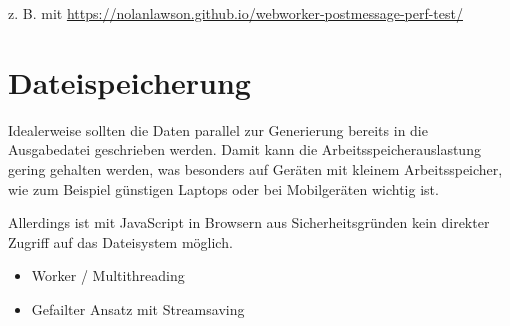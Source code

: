 z. B. mit \url{https://nolanlawson.github.io/webworker-postmessage-perf-test/}


\section{Dateispeicherung}

Idealerweise sollten die Daten parallel zur Generierung bereits in die Ausgabedatei geschrieben werden. Damit kann die Arbeitsspeicherauslastung gering gehalten werden, was besonders auf Geräten mit kleinem Arbeitsspeicher, wie zum Beispiel günstigen Laptops oder bei Mobilgeräten wichtig ist.

Allerdings ist mit JavaScript in Browsern aus Sicherheitsgründen kein direkter Zugriff auf das Dateisystem möglich. 

\begin{itemize}
    \item Worker / Multithreading
    \item Gefailter Ansatz mit Streamsaving
\end{itemize}